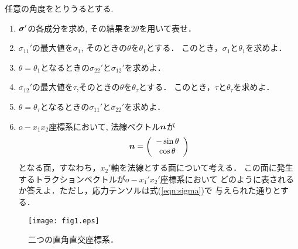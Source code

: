 \documentclass[10pt,a4j]{jarticle}
\begin{document}
任意の角度をとりうるとする.
\begin{enumerate}
\item
	$\mbox{\boldmath $\sigma$}'$の各成分を求め, その結果を$2\theta$を用いて表せ．
\item
	$\sigma_{11}'$の最大値を$\sigma_1$, そのときの$\theta$を$\theta_1$とする．
	このとき，$\sigma_1$と$\theta_1$を求めよ．
\item
	$\theta=\theta_1$となるときの$\sigma_{22}'$と$\sigma_{12}'$を求めよ．
\item
	$\sigma_{12}'$の最大値を$\tau$,そのときの$\theta$を$\theta_\tau$とする．
	このとき，$\tau$と$\theta_\tau$を求めよ．
\item
	$\theta=\theta_\tau$となるときの$\sigma_{11}'$と$\sigma_{22}'$を求めよ．
\item
	$o-x_1x_2$座標系において, 法線ベクトル$\mbox{\boldmath $n$}$が
	\[
		\mbox{\boldmath $n$}=\left( 
		\begin{array}{c}
			-\sin \theta \\
			\cos \theta
		\end{array}
		\right)
	\]
	となる面，すなわち，$x_2'$軸を法線とする面について考える．
	この面に発生するトラクションベクトルが$o-x_1'x_2'$座標系において
	どのように表されるか答えよ．ただし，応力テンソルは式(\ref{eqn:sigma})で
	与えられた通りとする．
\end{enumerate}
\begin{figure}[h]
	\begin{center}
	\texttt{[image: fig1.eps]} 
	\end{center}
	\vspace{-5mm}
	\caption{二つの直角直交座標系．} 
	\label{fig:fig1}
\end{figure}
\end{document}
